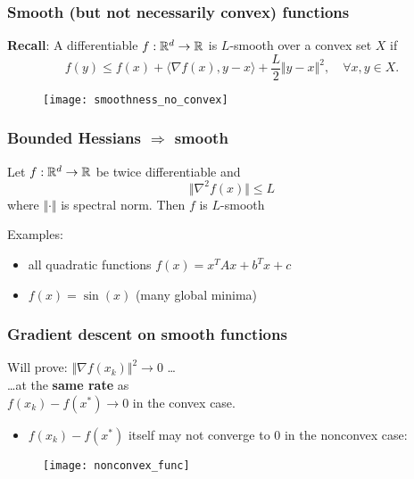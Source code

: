 \documentclass[aspectratio=149]{beamer}
\begin{document}
\begin{frame}
  \frametitle{Smooth (but not necessarily convex) functions}
  \textbf{Recall}: A differentiable $f : \mathbb{R}^d \to \mathbb{R}$ is $L$-smooth over a convex set $X$ if
  \begin{equation}
    f(y) \le f(x) + \langle \nabla f(x), y- x \rangle + \frac{L}{2} \Vert y-x \Vert^2, \quad \forall x,y \in X.
  \end{equation}
  \begin{figure}[ht]
    \centering
    \texttt{[image: smoothness\_no\_convex]}
  \end{figure}
\end{frame}


\begin{frame}
  \frametitle{Bounded Hessians $\Rightarrow$ smooth}
  \begin{lemma}%
    Let $f: \mathbb{R}^d \to \mathbb{R}$ be twice differentiable and
    \begin{equation}
      \Vert \nabla^2 f(x) \Vert \le L
    \end{equation}
    where $\Vert \cdot \Vert$ is spectral norm. Then $f$ is $L$-smooth
  \end{lemma}

  Examples:
  \begin{itemize}
    \item all quadratic functions $f(x)= x^T Ax + b^T x + c$
    \item $f(x) = \sin (x)$ (many global minima)
  \end{itemize}
\end{frame}


\begin{frame}
  \frametitle{Gradient descent on smooth functions}
  \begin{minipage}{0.5\textwidth}
  Will prove: $\Vert \nabla f(x_k) \Vert^2 \to 0$ \ldots \\
  \ldots at the \textbf{same rate} as \\
  $f(x_k) -f(x^*) \to 0$ in the convex case.
  \begin{itemize}
    \item $f(x_k) -f(x^*)$ itself may not converge to 0 in the nonconvex case:
  \end{itemize}
  \end{minipage}
  \begin{minipage}{0.45\textwidth}
    \begin{figure}[ht]
      \centering
      \texttt{[image: nonconvex\_func]}
    \end{figure}
  \end{minipage}
\end{frame}
\end{document}
